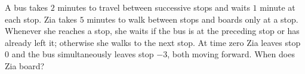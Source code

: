 A bus takes $2$ minutes to travel between successive stops and waits $1$ minute at each stop. Zia takes $5$ minutes to walk between stops and boards only at a stop. Whenever she reaches a stop, she waits if the bus is at the preceding stop or has already left it; otherwise she walks to the next stop. At time zero Zia leaves stop $0$ and the bus simultaneously leaves stop $-3$, both moving forward. When does Zia board?
